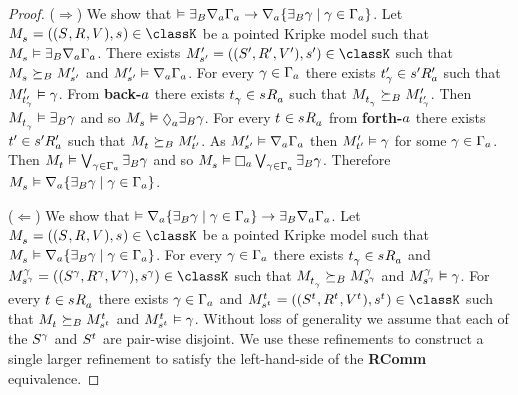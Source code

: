 \begin{proof}
($\Rightarrow$) 
We show that $\entails \somerefsBs \coversA \Gamma_\agentA \implies \coversA \{\somerefsBs \gamma \mid \gamma \in \Gamma_\agentA\}$.
Let $\kPModelAndTuple{\kStateS} \in \classK$ be a pointed Kripke model such that $\kPModel{\kStateS} \entails \somerefsBs \coversA \Gamma_\agentA$.
There exists $\kPModelAndTupleP{\kStateSP} \in \classK$ such that $\kPModel{\kStateS} \simulatesBs \kPModelP{\kStateSP}$ and $\kPModelP{\kStateSP} \entails \coversA \Gamma_\agentA$.
For every $\gamma \in \Gamma_\agentA$ there exists $\kStateTP_\gamma \in \kSuccessorsPA{\kStateSP}$ such that $\kPModelP{\kStateTP_\gamma} \entails \gamma$.
From {\bf back-$\agentA$} there exists $\kStateT_\gamma \in \kSuccessorsA{\kStateS}$ such that $\kPModel{\kStateT_\gamma} \simulatesBs \kPModelP{\kStateTP_\gamma}$.
Then $\kPModel{\kStateT_\gamma} \entails \somerefsBs \gamma$ and so $\kPModel{\kStateS} \entails \possibleA \somerefsBs \gamma$.
For every $\kStateT \in \kSuccessorsA{\kStateS}$ from {\bf forth-$\agentA$} there exists $\kStateTP \in \kSuccessorsPA{\kStateSP}$ such that $\kPModel{\kStateT} \simulatesBs \kPModelP{\kStateTP}$.
As $\kPModelP{\kStateSP} \entails \coversA \Gamma_\agentA$ then $\kPModelP{\kStateTP} \entails \gamma$ for some $\gamma \in \Gamma_\agentA$.
Then $\kPModel{\kStateT} \entails \bigvee_{\gamma \in \Gamma_\agentA} \somerefsBs \gamma$ and so $\kPModel{\kStateS} \entails \necessaryA \bigvee_{\gamma \in \Gamma_\agentA} \somerefsBs \gamma$.
Therefore $\kPModel{\kStateS} \entails \coversA \{\somerefsBs \gamma \mid \gamma \in \Gamma_\agentA\}$.

($\Leftarrow$)
We show that $\entails \coversA \{\somerefsBs \gamma \mid \gamma \in \Gamma_\agentA\} \implies \somerefsBs \coversA \Gamma_\agentA$.
Let $\kPModelAndTuple{\kStateS} \in \classK$ be a pointed Kripke model such that $\kPModel{\kStateS} \entails \coversA \{\somerefsBs \gamma \mid \gamma \in \Gamma_\agentA\}$.
For every $\gamma \in \Gamma_\agentA$ there exists $\kStateT_\gamma \in \kSuccessorsA{\kStateS}$ and $\kPModelAndTuple[\gamma]{\kStateS[\gamma]} \in \classK$ such that $\kPModel{\kStateT_\gamma} \simulatesBs \kPModel[\gamma]{\kStateS[\gamma]}$ and $\kPModel[\gamma]{\kStateS[\gamma]} \entails \gamma$.
For every $\kStateT \in \kSuccessorsA{\kStateS}$ there exists $\gamma \in \Gamma_\agentA$ and $\kPModelAndTuple[\kStateT]{\kStateS[\kStateT]} \in \classK$ such that $\kPModel{\kStateT} \simulatesBs \kPModel[\kStateT]{\kStateS[\kStateT]}$ and $\kPModel[\kStateT]{\kStateS[\kStateT]} \entails \gamma$.
Without loss of generality we assume that each of the $\kStates[\gamma]$ and $\kStates[\kStateT]$ are pair-wise disjoint.
We use these refinements to construct a single larger refinement to satisfy the left-hand-side of the {\bf RComm} equivalence.


\end{proof}
